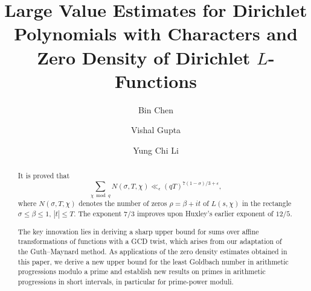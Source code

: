 \documentclass[12pt]{amsart}
\makeatletter
\theoremstyle{definition}
\theoremstyle{plain}
\theoremstyle{remark}
\numberwithin{equation}{section}
\numberwithin{theorem}{section}
\numberwithin{equation}{section}
\newcommand{\statement}[1]{\def\@statement{#1}}
\def\@statement{}
\makeatother
\begin{document}
	\title[Large value and zero density estimates for Dirichlet $L$-functions]{Large Value Estimates for Dirichlet Polynomials with Characters and Zero Density of Dirichlet $L$-Functions}
	
	\author{Bin Chen}
	\address{Bin Chen\\ Department of Mathematics: Analysis, Logic and Discrete Mathematics\\ Ghent University\\ Krijgslaan 281\\ B 9000 Ghent\\ Belgium}
	\author{Vishal Gupta}
	\address{Vishal Gupta\\ Mathematical Institute, University of Oxford}
	
	\author{Yung Chi Li}
	\address{Yung Chi Li\\ Department of Mathematics, Northwestern University}
	\statement{After the preprint \cite{Chen2025} by the first author was released, the other authors informed BC that they had independently obtained the exponent $7/3$ in the zero density estimate. The present version is the result of the authors' subsequent collaboration on this topic.}
	\begin{abstract} 
		It is proved that
		\[
		\sum_{\chi \bmod q}N(\sigma,T,\chi)
		\ll_{\epsilon}
		(qT)^{7(1-\sigma)/3+\epsilon},
		\]
		where $N(\sigma,T,\chi)$ denotes the number of zeros
		$\rho=\beta+it$ of $L(s,\chi)$ in the rectangle
		$\sigma\leq \beta\leq 1$, $|t|\leq T$. The exponent $7/3$ improves upon
		Huxley's earlier exponent of $12/5$.
		
		The key innovation lies in deriving a sharp upper bound for sums over affine transformations of functions with a GCD twist, which arises from our adaptation of the Guth--Maynard method. As applications of the zero density estimates obtained in this paper, we derive a new upper bound for the least Goldbach number in arithmetic progressions modulo a prime and establish new results on primes in arithmetic progressions in short intervals, in particular for prime-power moduli.
	\end{abstract}
	
	
	
	
	\maketitle
	
\end{document}
